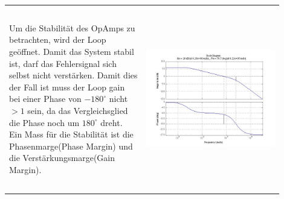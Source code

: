 \begin{tabular}{p{0.45\linewidth}p{0.45\linewidth}}
	Um die Stabilität des OpAmps zu betrachten, wird der Loop geöffnet. Damit das System stabil ist, darf das Fehlersignal sich selbst nicht verstärken. Damit dies der Fall ist muss der Loop gain bei einer Phase von $-180^\circ$ nicht $>1$ sein, da das Vergleichsglied die Phase noch um $180^\circ$ dreht. Ein Mass für die Stabilität ist die Phasenmarge(Phase Margin) und die Verstärkungsmarge(Gain Margin). 
	& \begin{minipage}{0.4\linewidth}
		 \includegraphics[height=8cm, width=10cm]{./pictures/margins.jpg}
	  \end{minipage}\\
\end{tabular}
